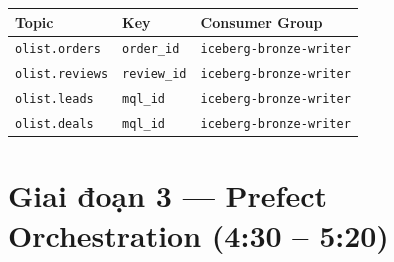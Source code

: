 \documentclass[12pt, a4paper]{article}
\newcommand{\code}[1]{\texttt{\small#1}}
\begin{document}
\begin{tcolorbox}[colback=gray!5, colframe=p2color!50, arc=6pt,
  title={\faSitemap\ Sơ đồ --- Luồng Streaming vào Bronze Iceberg}]
\begin{center}
\small
\begin{tabular}{lll}
\toprule
\textbf{Topic} & \textbf{Key} & \textbf{Consumer Group} \\
\midrule
\code{olist.orders}  & \code{order\_id}  & \code{iceberg-bronze-writer} \\
\code{olist.reviews} & \code{review\_id} & \code{iceberg-bronze-writer} \\
\code{olist.leads}   & \code{mql\_id}    & \code{iceberg-bronze-writer} \\
\code{olist.deals}   & \code{mql\_id}    & \code{iceberg-bronze-writer} \\
\bottomrule
\end{tabular}
\end{center}
\end{tcolorbox}

\newpage

\section{Giai đoạn 3 --- Prefect Orchestration (4:30 -- 5:20)}
\end{document}
